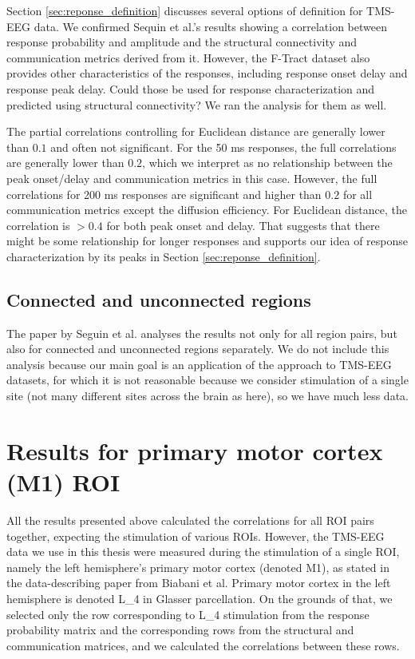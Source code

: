 Section \ref{sec:reponse_definition} discusses several options of  definition for TMS-EEG data. We confirmed Sequin et al.'s results showing a correlation between response probability and amplitude and the structural connectivity and communication metrics derived from it. However, the F-Tract dataset also provides other characteristics of the responses, including response onset delay and response peak delay. Could those be used for response characterization and predicted using structural connectivity? We ran the analysis for them as well.

The partial correlations controlling for Euclidean distance are generally lower than $0.1$ and often not significant. For the 50 ms responses, the full correlations are generally lower than $0.2$, which we interpret as no relationship between the peak onset/delay and communication metrics in this case. However, the full correlations for 200 ms responses are significant and higher than $0.2$ for all communication metrics except the diffusion efficiency. For Euclidean distance, the correlation is $>0.4$ for both peak onset and delay. That suggests that there might be some relationship for longer responses and supports our idea of response characterization by its peaks in Section \ref{sec:reponse_definition}.

\subsection{Connected and unconnected regions}

The paper by Seguin et al. \cite{seguin_communication_2023} analyses the results not only for all region pairs, but also for connected and unconnected regions separately. We do not include this analysis because our main goal is an application of the approach to TMS-EEG datasets, for which it is not reasonable because we consider stimulation of a single site (not many different sites across the brain as here), so we have much less data.

\section{Results for primary motor cortex (M1) ROI}\label{sec:ftract_results_per_roi}

All the results presented above calculated the correlations for all ROI pairs together, expecting the stimulation of various ROIs. However, the TMS-EEG data we use in this thesis were measured during the stimulation of a single ROI, namely the left hemisphere's primary motor cortex (denoted M1), as stated in the data-describing paper from Biabani et al. \cite{biabani_characterizing_2019} Primary motor cortex in the left hemisphere is denoted L\_4 in Glasser parcellation. On the grounds of that, we selected only the row corresponding to L\_4 stimulation from the response probability matrix and the corresponding rows from the structural and communication matrices, and we calculated the correlations between these rows. 

